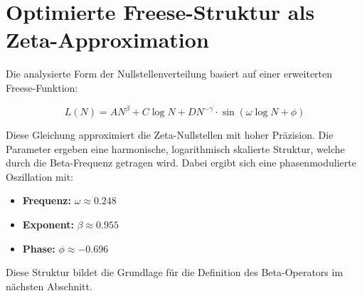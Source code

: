 \section{Optimierte Freese-Struktur als Zeta-Approximation}
Die analysierte Form der Nullstellenverteilung basiert auf einer erweiterten Freese-Funktion:

\[
L(N) = A N^\beta + C \log N + D N^{-\gamma} \cdot \sin(\omega \log N + \phi)
\]

Diese Gleichung approximiert die Zeta-Nullstellen mit hoher Präzision. Die Parameter ergeben eine harmonische, logarithmisch skalierte Struktur, welche durch die Beta-Frequenz getragen wird. Dabei ergibt sich eine phasenmodulierte Oszillation mit:

\begin{itemize}
  \item \textbf{Frequenz:} \( \omega \approx 0.248 \)
  \item \textbf{Exponent:} \( \beta \approx 0.955 \)
  \item \textbf{Phase:} \( \phi \approx -0.696 \)
\end{itemize}

Diese Struktur bildet die Grundlage für die Definition des Beta-Operators im nächsten Abschnitt.